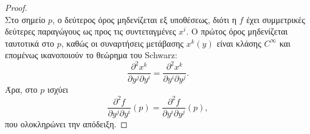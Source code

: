 \documentclass[11pt,a4paper,twoside,openright]{book}
\begin{document}
\begin{proof}
\begin{equation}
\end{equation}
Στο σημείο \(p\), ο δεύτερος όρος μηδενίζεται εξ υποθέσεως, διότι η \(f\) έχει συμμετρικές δεύτερες παραγώγους ως προς τις συντεταγμένες \(x^i\). Ο πρώτος όρος μηδενίζεται ταυτοτικά στο \(p\), καθώς οι συναρτήσεις μετάβασης \(x^k(y)\) είναι κλάσης \(C^\infty\) και επομένως ικανοποιούν το θεώρημα του Schwarz:
\begin{equation}
\frac{\partial^2 x^k}{\partial y^j \partial y^i} = \frac{\partial^2 x^k}{\partial y^i \partial y^j}.
\end{equation}
Άρα, στο \(p\) ισχύει
\begin{equation}
\frac{\partial^2 f}{\partial y^j \partial y^i}(p) = \frac{\partial^2 f}{\partial y^i \partial y^j}(p),
\end{equation}
που ολοκληρώνει την απόδειξη.
\end{proof}
\end{document}

